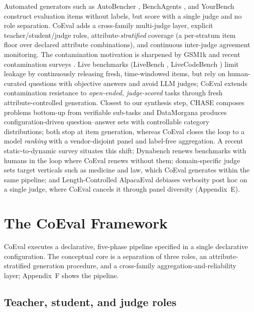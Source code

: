 Automated generators such as AutoBencher \citep{ref9}, BenchAgents \citep{ref10}, and YourBench
\citep{ref11} construct evaluation items without labels, but score with a single judge and no role
separation. CoEval adds a cross-family multi-judge layer, explicit teacher/student/judge roles,
attribute-\emph{stratified} coverage (a per-stratum item floor over declared attribute combinations), and continuous
inter-judge agreement monitoring. The contamination motivation is sharpened by GSM1k \citep{ref12} and recent
contamination surveys \citep{ref13}. Live benchmarks (LiveBench \citep{ref22}, LiveCodeBench
\citep{ref23}) limit leakage by continuously releasing fresh, time-windowed items, but rely on
human-curated questions with objective answers and avoid LLM judges; CoEval extends contamination resistance to
\emph{open-ended, judge-scored} tasks through fresh attribute-controlled generation. Closest to our synthesis step,
CHASE \citep{ref30} composes problems bottom-up from verifiable sub-tasks and DataMorgana
\citep{ref31} produces configuration-driven question--answer sets with controllable category
distributions; both stop at item generation, whereas CoEval closes the loop to a model \emph{ranking} with a
vendor-disjoint panel and label-free aggregation. A recent static-to-dynamic survey \citep{ref32} situates
this shift; Dynabench \citep{ref14} renews benchmarks with humans in the loop where CoEval renews without
them; domain-specific judge sets \citep{ref25} target verticals such as medicine and law, which CoEval
generates within the same pipeline; and Length-Controlled AlpacaEval \citep{ref8} debiases verbosity post hoc
on a single judge, where CoEval cancels it through panel diversity (Appendix~E).

\section{The CoEval Framework}\label{the-coeval-framework}

CoEval executes a declarative, five-phase pipeline specified in a single declarative configuration. The conceptual core is a
separation of three roles, an attribute-stratified generation procedure, and a cross-family aggregation-and-reliability
layer; Appendix~F shows the pipeline.

\subsection{Teacher, student, and judge roles}\label{teacher-student-and-judge-roles}

